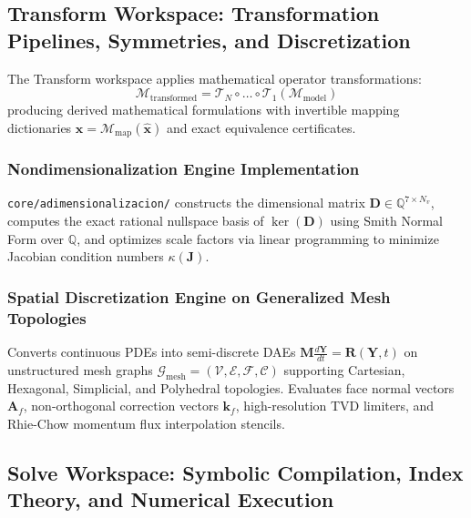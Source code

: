 \documentclass[11pt,a4paper]{article}
\begin{document}
\subsection{Transform Workspace: Transformation Pipelines, Symmetries, and Discretization}
\label{subsec:transform-workspace-methodology}

The Transform workspace applies mathematical operator transformations:
\begin{equation}
\mathcal{M}_{\text{transformed}} = \mathcal{T}_N \circ \dots \circ \mathcal{T}_1 (\mathcal{M}_{\text{model}})
\end{equation}
producing derived mathematical formulations with invertible mapping dictionaries $\mathbf{x} = \mathcal{M}_{\text{map}}(\hat{\mathbf{x}})$ and exact equivalence certificates.

\subsubsection{Nondimensionalization Engine Implementation}
\texttt{core/adimensionalizacion/} constructs the dimensional matrix $\mathbf{D} \in \mathbb{Q}^{7 \times N_v}$, computes the exact rational nullspace basis of $\ker(\mathbf{D})$ using Smith Normal Form over $\mathbb{Q}$, and optimizes scale factors via linear programming to minimize Jacobian condition numbers $\kappa(\mathbf{J})$.

\subsubsection{Spatial Discretization Engine on Generalized Mesh Topologies}
Converts continuous PDEs into semi-discrete DAEs $\mathbf{M} \frac{d\mathbf{Y}}{dt} = \mathbf{R}(\mathbf{Y}, t)$ on unstructured mesh graphs $\mathcal{G}_{\text{mesh}} = (\mathcal{V}, \mathcal{E}, \mathcal{F}, \mathcal{C})$ supporting Cartesian, Hexagonal, Simplicial, and Polyhedral topologies. Evaluates face normal vectors $\mathbf{A}_f$, non-orthogonal correction vectors $\mathbf{k}_f$, high-resolution TVD limiters, and Rhie-Chow momentum flux interpolation stencils.

\subsection{Solve Workspace: Symbolic Compilation, Index Theory, and Numerical Execution}
\label{subsec:solve-workspace-compilation}
\end{document}
